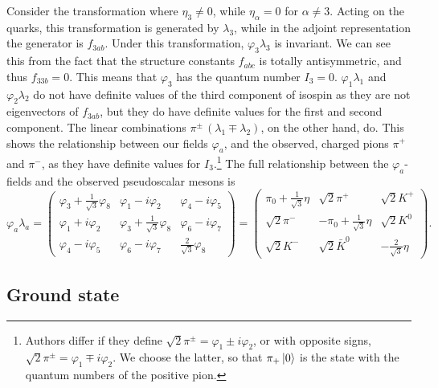 Consider the transformation where $\eta_3 \neq 0$, while $\eta_\alpha = 0$ for $\alpha \neq 3$.
Acting on the quarks, this transformation is generated by $\lambda_3$, while in the adjoint representation the generator is $f_{3ab}$.
Under this transformation,  $\varphi_3\lambda_3$ is invariant.
We can see this from the fact that the structure constants $f_{abc}$ is totally antisymmetric, and thus $f_{33b} = 0$.
This means that $\varphi_3$ has the quantum number $I_3 = 0$.
$\varphi_1\lambda_1$ and $\varphi_2\lambda_2$ do not have definite values of the third component of isospin as they are not eigenvectors of $f_{3ab}$, but they do have definite values for the first and second component.
The linear combinations $\pi^\pm \, (\lambda_1 \mp \lambda_2)$, on the other hand, do.
This shows the relationship between our fields $\varphi_a$, and the observed, charged pions $\pi^+$ and $\pi^-$, as they have definite values for $I_3$.\footnote{
    Authors differ if they define $\sqrt 2 \pi^\pm = \varphi_1 \pm i \varphi_2$, or with opposite signs, $\sqrt 2 \pi^\pm = \varphi_1 \mp i \varphi_2$.  We choose the latter, so that $\pi_+ \ket{0}$ is the state with the quantum numbers of the positive pion.
    }
The full relationship between the $\varphi_a$-fields  and the observed pseudoscalar mesons is~\autocite{schererIntroductionChiralPerturbation2002}
%
\begin{equation}
    \varphi_a \lambda_a
    =
    \begin{pmatrix}
        \varphi_3 + \frac{1}{\sqrt{3}} \varphi_8 & \varphi_1 - i \varphi_2 & \varphi_4 - i \varphi_5 \\
        \varphi_1 + i \varphi_2 & \varphi_3 + \frac{1}{\sqrt{3}} \varphi_8 & \varphi_6 - i \varphi_7  \\
        \varphi_4 - i \varphi_5 & \varphi_6 - i \varphi_7  & \frac{2}{\sqrt{3}} \varphi_8
    \end{pmatrix}
    =
    \begin{pmatrix}
        \pi_0 + \frac{1}{\sqrt{3}}\eta & \sqrt{2}\pi^+ & \sqrt{2}K^+ \\
        \sqrt{2}\pi^- & -\pi_0 + \frac{1}{\sqrt{3}}\eta & \sqrt{2}K^0 \\
        \sqrt{2}K^- & \sqrt{2}\bar K^0  & - \frac{2}{\sqrt 3} \eta
    \end{pmatrix}.
\end{equation}




\subsection{Ground state}

